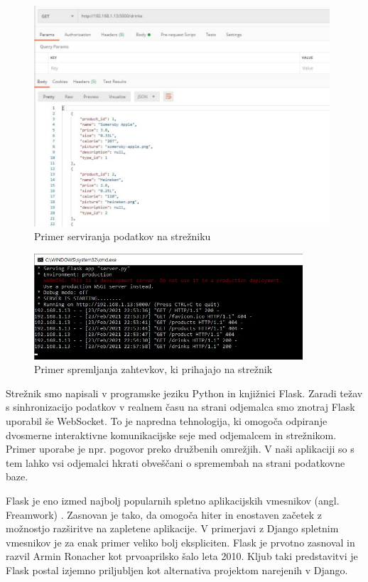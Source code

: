 \documentclass[a4paper, 12pt]{book}
\begin{document}
\begin{figure}
\begin{center}
\includegraphics[width=11cm]{Server_example.jpg}
\end{center}
\caption{Primer serviranja podatkov na strežniku}
\label{ServerEX}
\end{figure}
\begin{figure}
\begin{center}
\includegraphics[width=10cm]{Server_example_2.jpg}
\end{center}
\caption{Primer spremljanja zahtevkov, ki prihajajo na strežnik}
\label{ServerEX2}
\end{figure}

Strežnik smo napisali v programske jeziku Python in knjižnici Flask. Zaradi težav s sinhronizacijo podatkov v realnem času na strani odjemalca smo znotraj Flask uporabil še WebSocket. To je napredna tehnologija, ki omogoča odpiranje dvosmerne interaktivne komunikacijske seje med odjemalcem in strežnikom. Primer uporabe je npr. pogovor preko družbenih omrežjih. V naši aplikaciji so s tem lahko vsi odjemalci hkrati obveščani o spremembah na strani podatkovne baze. 

Flask je eno izmed najbolj popularnih spletno aplikacijskih vmesnikov (angl. Freamwork) \cite{Flask}. Zasnovan je tako, da omogoča hiter in enostaven začetek z možnostjo razširitve na zapletene aplikacije. V primerjavi z Django spletnim vmesnikov je za enak primer veliko bolj ekspliciten. Flask je prvotno zasnoval in razvil Armin Ronacher kot prvoaprilsko šalo leta 2010. Kljub taki predstavitvi je Flask postal izjemno priljubljen kot alternativa projektom narejenih v Django. 
\end{document}
